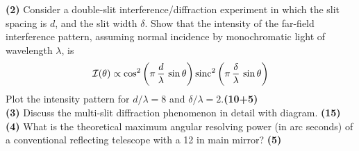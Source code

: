 \documentclass[12pt, a4paper]{article}
\begin{document}
\noindent
\textbf{(2)} Consider a double-slit interference/diffraction experiment in which the slit spacing is 
$d$, and the slit width $\delta$. Show that the intensity of the far-field interference pattern, 
assuming normal incidence by monochromatic light of wavelength $\lambda $, is
\begin{align*}
    {\cal I}(\theta)\propto \cos^2\left(\pi\,\frac{d}{\lambda}\,\sin\theta\right){\rm sinc}^2\left(\pi\,\frac{\delta}{\lambda}\,\sin\theta\right)
\end{align*}
Plot the intensity pattern for $d/\lambda=8$ and $\delta /\lambda =2$.\hfill\textbf{(10+5)}\\

\noindent
\textbf{(3)} Discuss the multi-slit diffraction phenomenon in detail with diagram. \hfill\textbf{(15)}\\

\noindent
\textbf{(4)} What is the theoretical maximum angular resolving power (in arc seconds) of a conventional
reflecting telescope with a 12 in main mirror? \hfill\textbf{(5)}\\
\end{document}
